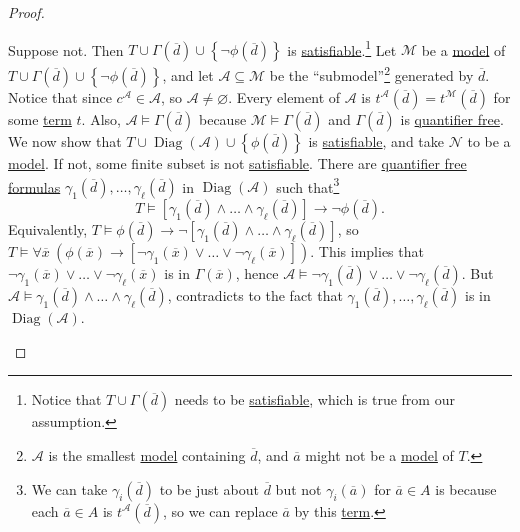 \begin{proof}
\begin{explanation}
		Suppose not. Then \(T \cup \Gamma (\overline{d} ) \cup \left\{ \lnot \phi (\overline{d} ) \right\} \) is \hyperref[def:satisfiable]{satisfiable}.\footnote{Notice that \(T \cup \Gamma (\overline{d} )\) needs to be \hyperref[def:satisfiable]{satisfiable}, which is true from our assumption.} Let \(\mathcal{M}\) be a \hyperref[def:model]{model} of \(T \cup \Gamma (\overline{d} ) \cup \left\{ \lnot \phi (\overline{d} ) \right\} \), and let \(\mathcal{A} \subseteq \mathcal{M} \) be the ``submodel''\footnote{\(\mathcal{A} \) is the smallest \hyperref[def:model]{model} containing \(\overline{d} \), and \(\overline{a} \) might not be a \hyperref[def:model]{model} of \(T\).} generated by \(\overline{d} \). Notice that since \(c^{\mathcal{A} } \in \mathcal{A} \), so \(\mathcal{A} \neq \varnothing \). Every element of \(\mathcal{A} \) is \(t^{\mathcal{A} }(\overline{d} ) = t^{\mathcal{M} }(\overline{d} ) \) for some \hyperref[def:term]{term} \(t\). Also, \(\mathcal{A} \models \Gamma (\overline{d} )\) because \(\mathcal{M} \models \Gamma (\overline{d} )\) and \(\Gamma (\overline{d} )\) is \hyperref[not:quantifier-free]{quantifier free}. We now show that \(T \cup \mathop{\mathrm{Diag}}(\mathcal{A} ) \cup \left\{ \phi (\overline{d} ) \right\} \) is \hyperref[def:satisfiable]{satisfiable}, and take \(\mathcal{N} \) to be a \hyperref[def:model]{model}. If not, some finite subset is not \hyperref[def:satisfiable]{satisfiable}. There are \hyperref[not:quantifier-free]{quantifier free} \hyperref[def:formula]{formulas} \(\gamma _1(\overline{d} ), \ldots , \gamma _\ell (\overline{d} )\) in \(\mathop{\mathrm{Diag}}(\mathcal{A} ) \) such that\footnote{We can take \(\gamma _i(\overline{d} )\) to be just about \(\overline{d} \) but not \(\gamma _i(\overline{a} )\) for \(\overline{a} \in A\) is because each \(\overline{a} \in A\) is \(t^{\mathcal{A} } (\overline{d} )\), so we can replace \(\overline{a} \) by this \hyperref[def:term]{term}.}
		\[
			T \models \left[ \gamma _1(\overline{d} ) \land \ldots \land \gamma _\ell (\overline{d} ) \right] \to \lnot \phi (\overline{d} ).
		\]
		Equivalently, \(T \models \phi (\overline{d} ) \to \lnot \left[ \gamma _1(\overline{d} ) \land \ldots \land \gamma _\ell (\overline{d} ) \right] \), so \(T \models \forall \overline{x}\ \left( \phi (\overline{x} ) \to \left[ \lnot \gamma _1(\overline{x} ) \lor \ldots \lor \lnot \gamma _\ell (\overline{x} ) \right]  \right) \). This implies that \(\lnot \gamma _1(\overline{x} ) \lor \ldots \lor \lnot \gamma _\ell (\overline{x} )\) is in \(\Gamma (\overline{x} )\), hence \(\mathcal{A} \models \lnot \gamma _1(\overline{d} ) \lor \ldots \lor \lnot \gamma _\ell (\overline{d} )\). But \(\mathcal{A} \models \gamma _1(\overline{d} ) \land \ldots \land \gamma _\ell (\overline{d} )\), contradicts to the fact that \(\gamma _1(\overline{d} ), \ldots , \gamma _\ell (\overline{d} )\) is in \(\mathop{\mathrm{Diag}}(\mathcal{A} ) \).


\end{explanation}
\end{proof}
